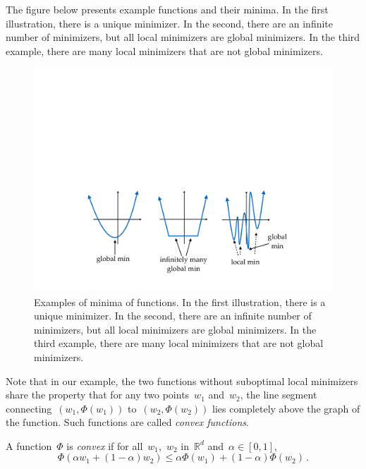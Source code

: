 \documentclass{tufte-book}
\begin{document}
The figure below presents example functions and their minima. In the
first illustration, there is a unique minimizer. In the second, there
are an infinite number of minimizers, but all local minimizers are
global minimizers. In the third example, there are many local minimizers
that are not global minimizers.

\begin{figure}
\centering
\includegraphics[width=1\textwidth,height=\textheight]{assets/minima}
\caption{Examples of minima of functions. In the first illustration,
there is a unique minimizer. In the second, there are an infinite number
of minimizers, but all local minimizers are global minimizers. In the
third example, there are many local minimizers that are not global
minimizers.}
\end{figure}

Note that in our example, the two functions without suboptimal local
minimizers share the property that for any two points~\(w_1\)
and~\(w_2\), the line segment connecting~\((w_1,\Phi(w_1))\)
to~\((w_2,\Phi(w_2))\) lies completely above the graph of the function.
Such functions are called \emph{convex functions}.

\begin{Definition}

A function~\(\Phi\) is \emph{convex} if for all~\(w_1\),~\(w_2\)
in~\(\mathbb{R}^d\) and~\(\alpha \in [0,1]\), \[
        \Phi(\alpha w_1 + (1-\alpha) w_2 )\leq \alpha\Phi(w_1)+(1-\alpha)\Phi(w_2)\,.
\]

\end{Definition}
\end{document}

